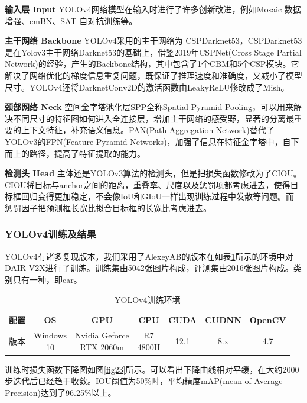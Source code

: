 \textbf{输入层 Input}
YOLOv4网络模型在输入时进行了许多创新改进，例如Mosaic 数据增强、cmBN、SAT 自对抗训练等。

\textbf{主干网络 Backbone} 
YOLOv4采用的主干网络为 CSPDarknet53，CSPDarknet53是在Yolov3主干网络Darknet53的基础上，借鉴2019年CSPNet(Cross Stage Partial Network)的经验，产生的Backbone结构，其中包含了1个CBM和5个CSP模块。它解决了网络优化的梯度信息重复问题，既保证了推理速度和准确度，又减小了模型尺寸。YOLOv4还将DarknetConv2D的激活函数由LeakyReLU修改成了Mish。

\textbf{颈部网络 Neck} 
空间金字塔池化层SPP全称Spatial Pyramid Pooling，可以用来解决不同尺寸的特征图如何进入全连接层，增加主干网络的感受野，显著的分离最重要的上下文特征，补充语义信息。PAN(Path Aggregation Network)替代了YOLOv3的FPN(Feature Pyramid
Networks)，加强了信息在特征金字塔中，自下而上的路径，提高了特征提取的能力。

\textbf{检测头 Head} 主体还是YOLOv3算法的检测头，但是把损失函数修改为了CIOU。CIOU将目标与anchor之间的距离，重叠率、尺度以及惩罚项都考虑进去，使得目标框回归变得更加稳定，不会像IoU和GIoU一样出现训练过程中发散等问题。而惩罚因子把预测框长宽比拟合目标框的长宽比考虑进去。

\subsubsection{YOLOv4训练及结果}

YOLOv4有诸多复现版本，我们采用了AlexeyAB的版本在如表\ref{table7}所示的环境中对DAIR-V2X进行了训练。训练集由5042张图片构成，评测集由2016张图片构成。类别只有一种，即car。

\begin{table}[htb]
    \centering
    \caption{YOLOv4训练环境}
    \begin{tabular}{c c c c c c c}
    \toprule
    配置 & OS & GPU & CPU & CUDA & CUDNN & OpenCV \\
    \midrule
    版本 & \makecell{Windows\\10} & \makecell{Nvidia Geforce \\ RTX 2060m} & \makecell{R7\\ 4800H} & 12.1 & 8.x & 4.7\\
    \bottomrule
    \end{tabular}
    \label{table7}
\end{table}

训练时损失函数下降图如图\ref{fig23}所示。可以看出下降曲线相对平缓，在大约2000步迭代后已经趋于收敛。IOU阈值为50\%时，平均精度mAP(mean of Average Precision)达到了96.25\%以上。

